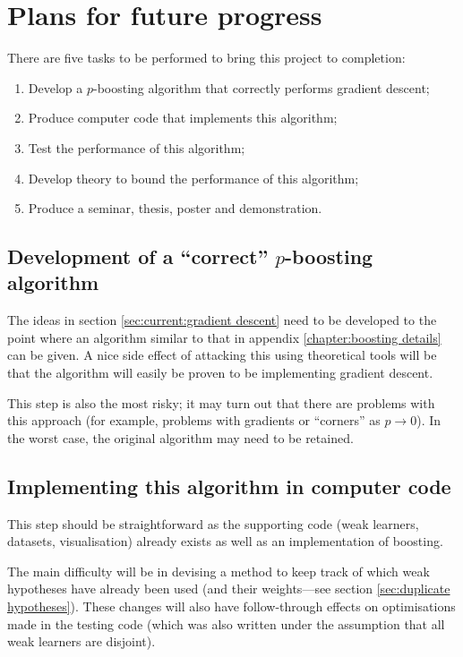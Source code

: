 \chapter{Plans for future progress}
\label{chapter:future}

There are five tasks to be performed to bring this project to
completion:

\begin{enumerate}
\item	Develop a $p$-boosting algorithm that correctly performs
	gradient descent;
\item	Produce computer code that implements this algorithm;
\item	Test the performance of this algorithm;
\item	Develop theory to bound the performance of this algorithm;
\item	Produce a seminar, thesis, poster and demonstration.
\end{enumerate}


\section{Development of a ``correct'' $p$-boosting algorithm}

The ideas in section \ref{sec:current:gradient descent} need to be
developed to the point where an algorithm similar to that in appendix
\ref{chapter:boosting details} can be given.  A nice side effect of
attacking this using theoretical tools will be that the algorithm will
easily be proven to be implementing gradient descent.

This step is also the most risky; it may turn out that there are
problems with this approach (for example, problems with gradients or
``corners'' as $p \rightarrow 0$).  In the worst case, the original
algorithm may need to be retained.


\section{Implementing this algorithm in computer code}

This step should be straightforward as the supporting code (weak
learners, datasets, visualisation) already exists as well as an
implementation of boosting.

The main difficulty will be in devising a method to keep track of
which weak hypotheses have already been used (and their weights---see
section \ref{sec:duplicate hypotheses}).
These changes will also have follow-through effects on optimisations
made in the testing code (which was also written under the assumption
that all weak learners are disjoint).


